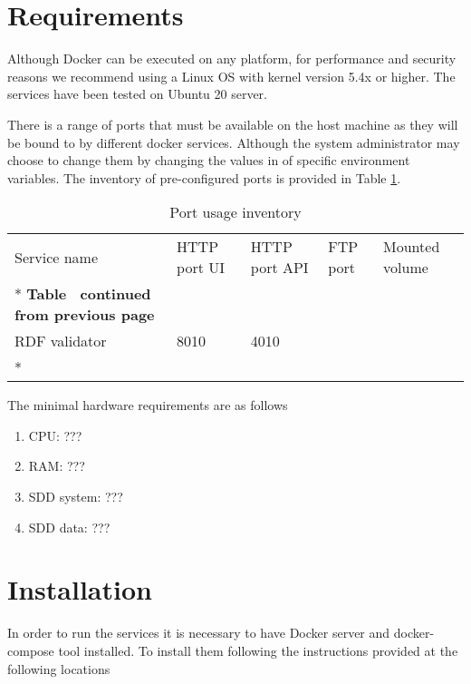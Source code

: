 \section{Requirements}
\label{sec:requirements}

Although Docker can be executed on any platform, for performance and security reasons we recommend using a Linux OS with kernel version 5.4x or higher. The services have been tested on Ubuntu 20 server.

There is a range of ports that must be available on the host machine as they will be bound to by different docker services. Although the system administrator may choose to change them by changing the values in of specific environment variables. The inventory of pre-configured ports is provided in Table \ref{tab:port-inventory}.

\begin{longtable}[c]{@{}p{3.64cm}p{1.25cm}p{1.25cm}p{1.9cm}p{5cm}@{}}
	\toprule
	Service name  & HTTP port UI & HTTP port API & FTP port & Mounted volume \\* \midrule
	\endfirsthead
	\multicolumn{5}{c}%
	{{\bfseries Table \thetable\ continued from previous page}}              \\
	\endhead
	\bottomrule
	\endfoot
	\endlastfoot
	RDF validator & 8010         & 4010          &          &                \\* \hline
	\caption{Port usage inventory}
	\label{tab:port-inventory}                                               \\
\end{longtable}

The minimal hardware requirements are as follows
\begin{enumerate}
	\item CPU: ???
	\item RAM: ???
	\item SDD system: ???
	\item SDD data: ???
\end{enumerate}

\section{Installation}
\label{sec:installation}

In order to run the services it is necessary to have Docker server and docker-compose tool installed. To install them following the instructions provided at the following locations


